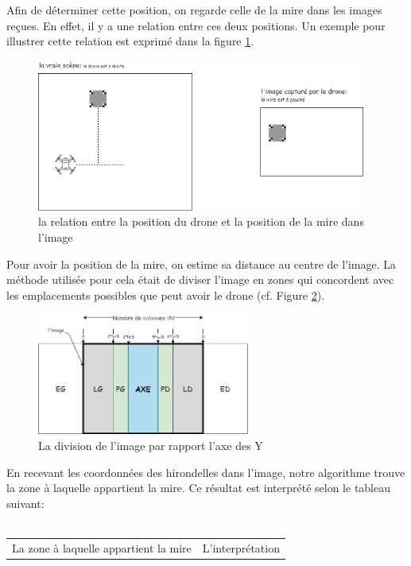 \documentclass[12pt]{article}
\begin{document}
\begin{enumerate}
            Afin de déterminer cette position, on regarde celle de la mire dans les images reçues. En effet, il y a  une relation entre ces deux positions. Un exemple pour illustrer cette relation est exprimé dans la figure \ref{fig:image13}.\\
            \begin{figure}[H]
            \centering
            \includegraphics[height=5cm]{image13.png}
            \caption{la relation entre la position du drone et la position de la mire dans l'image}
            \label{fig:image13}
            \end{figure}
            Pour avoir la position de la mire, on estime sa distance au centre de l’image. La méthode utilisée pour cela était de diviser l’image en zones qui concordent avec les emplacements possibles que peut avoir le drone (cf. Figure \ref{fig:image2}).\\
            \begin{figure}[H]
            \centering
            \includegraphics[height=4cm]{image2.jpg}
            \caption{La division de l'image par rapport l'axe des Y}
            \label{fig:image2}
            \end{figure}
            En recevant les coordonnées des hirondelles dans l’image, notre algorithme trouve la zone à laquelle appartient la mire. Ce résultat est interprété selon le tableau suivant:\\\\
            \begin{tabular}{|l|c|}
            \hline
            La zone à laquelle appartient la mire & L’interprétation\\

\end{tabular}
\end{enumerate}
\end{document}
